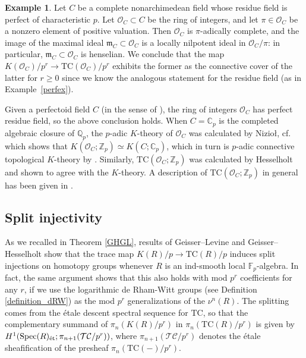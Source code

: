 \documentclass{amsart}
\theoremstyle{definition}
\newtheorem{example}[definition]{Example}
\newcommand{\bb}{\mathbb}
\newcommand{\sub}[1]{{\mbox{\rm \scriptsize #1}}}
\DeclareMathOperator{\Spec}{Spec}
\newcommand{\TC}{\mathrm{TC}}
\begin{document}
\begin{example} Let $C$ be a complete nonarchimedean field whose residue field is perfect of
characteristic $p$. 
Let $\mathcal{O}_C \subset C$ be the ring of integers, and let $\pi \in
\mathcal{O}_C$ be a nonzero element of positive valuation. 
Then $\mathcal{O}_C$ is $\pi$-adically complete, and the image of the maximal ideal 
$\mathfrak{m}_C \subset \mathcal{O}_C$  is a locally nilpotent ideal in
$\mathcal{O}_C/\pi$: in particular, $\mathfrak{m}_C \subset \mathcal{O}_C$ is
henselian. We conclude 
that the map $K( \mathcal{O}_C)/p^r \to \TC(
\mathcal{O}_C)/p^r$ exhibits the former as the connective cover of the latter
for $r \geq 0$ since we know the analogous statement for the residue field (as
in Example~\ref{perfex}). 


Given a perfectoid field $C$ (in the sense of \cite{Scholze}), the ring of
integers $\mathcal{O}_C$ has perfect residue field, so the above conclusion
holds. 
When $C = \mathbb{C}_p$ is the completed algebraic closure of $\mathbb{Q}_p$,
the $p$-adic $K$-theory of $\mathcal{O}_C$ 
was calculated by Nizio\l, cf.~\cite[Lem~3.1]{Niziol-crystalline} which shows that
$K(\mathcal{O}_C; \mathbb{Z}_p) \simeq K(C; \mathbb{C}_p)$, which in turn is
$p$-adic connective topological $K$-theory by \cite{Suslinalgclosed, Suslinlocal}. 
Similarly, $\TC(\mathcal{O}_C; \mathbb{Z}_p)$ was calculated by Hesselholt
\cite{HesselholtOC} and shown to agree with the $K$-theory. 
A description of $\TC(\mathcal{O}_C; \mathbb{Z}_p)$
in general has been given in \cite{BMS2}. 
\end{example} 



\subsection{Split injectivity}
As we recalled in Theorem \ref{GHGL}, results of Geisser--Levine and
Geisser--Hesselholt show that the trace map $K(R)/p\to \TC(R)/p$ induces
split injections on homotopy groups whenever $R$ is an ind-smooth local $\bb
F_p$-algebra.  In fact, the same argument shows that this also holds with mod
$p^r$ coefficients for any $r$, if we use the logarithmic de Rham-Witt groups
(see Definition \ref{definition_dRW}) as the mod $p^r$ generalizations of the
$\nu^n(R)$.  The splitting comes from the \'{e}tale descent spectral sequence
for $\TC$, so that the complementary summand of $\pi_n(K(R)/p^r)$ in
$\pi_n(\TC(R)/p^r)$ is given by
$H^1(\Spec(R)_\sub{\'{e}t};\pi_{n+1}(\mathcal{TC}/p^r))$, where
$\pi_{n+1}(\mathcal{TC}/p^r)$ denotes the \'etale sheafification of the presheaf $\pi_n(\TC(-)/p^r)$.
\end{document}
